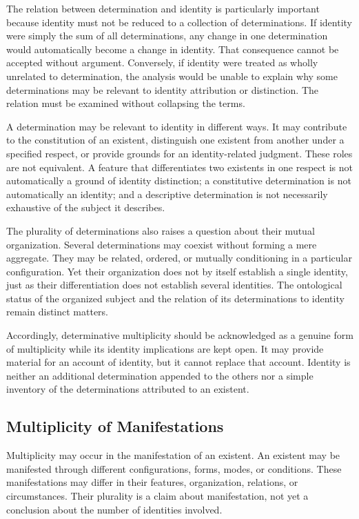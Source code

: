 The relation between determination and identity is particularly
important because identity must not be reduced to a collection
of determinations. If identity were simply the sum of all
determinations, any change in one determination would automatically
become a change in identity. That consequence cannot be accepted
without argument. Conversely, if identity were treated as wholly
unrelated to determination, the analysis would be unable to explain
why some determinations may be relevant to identity attribution
or distinction. The relation must be examined without collapsing
the terms.

A determination may be relevant to identity in different ways.
It may contribute to the constitution of an existent, distinguish
one existent from another under a specified respect, or provide
grounds for an identity-related judgment. These roles are not
equivalent. A feature that differentiates two existents in one
respect is not automatically a ground of identity distinction;
a constitutive determination is not automatically an identity;
and a descriptive determination is not necessarily exhaustive
of the subject it describes.

The plurality of determinations also raises a question about
their mutual organization. Several determinations may coexist
without forming a mere aggregate. They may be related, ordered,
or mutually conditioning in a particular configuration. Yet
their organization does not by itself establish a single identity,
just as their differentiation does not establish several identities.
The ontological status of the organized subject and the relation
of its determinations to identity remain distinct matters.

Accordingly, determinative multiplicity should be acknowledged
as a genuine form of multiplicity while its identity implications
are kept open. It may provide material for an account of identity,
but it cannot replace that account. Identity is neither an
additional determination appended to the others nor a simple
inventory of the determinations attributed to an existent.

\subsection{Multiplicity of Manifestations}

Multiplicity may occur in the manifestation of an existent. An
existent may be manifested through different configurations, forms,
modes, or conditions. These manifestations may differ in their
features, organization, relations, or circumstances. Their
plurality is a claim about manifestation, not yet a conclusion
about the number of identities involved.

